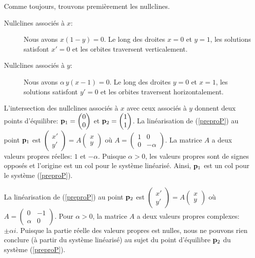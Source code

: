 {Comme toujours, trouvons premièrement les nullclines.
\begin{description}
\item[Nullclines associés à $x$:] Nous avons $x(1-y) = 0$.  Le long des droites
$x=0$ et $y=1$, les solutions satisfont
$x' = 0$ et les orbites traversent verticalement.
\item[Nullclines associés à $y$:] Nous avons $\alpha \,y(x - 1) = 0$.
Le long des droites $y=0$ et $x=1$, les solutions satisfont
$y' =0$ et les orbites traversent horizontalement.
\end{description}
L'intersection des nullclines associés à $x$ avec ceux associés à $y$
donnent deux points d'équilibre:
$\displaystyle \mathbf{p}_1 = \begin{pmatrix} 0 \\ 0 \end{pmatrix}$ et
$\displaystyle \mathbf{p}_2 = \begin{pmatrix} 1 \\ 1 \end{pmatrix}$.
La linéarisation de (\ref{preproP}) au point $\mathbf{p}_1$ est
$\begin{pmatrix} x' \\ y' \end{pmatrix} = A
\begin{pmatrix} x \\ y \end{pmatrix}$ où
$\displaystyle A = \begin{pmatrix} 1 & 0 \\ 0 & -\alpha \end{pmatrix}$.
La matrice $A$ a deux valeurs propres réelles: $1$ et $-\alpha$.  Puisque
$\alpha >0$, les valeurs propres sont de signes opposés et l'origine
est un col pour le système linéarisé.  Ainsi, $\mathbf{p}_1$ est un col
pour le système (\ref{preproP}).

La linéarisation de (\ref{preproP}) au point $\mathbf{p}_2$ est
$\begin{pmatrix} x' \\ y' \end{pmatrix} = A
\begin{pmatrix} x \\ y \end{pmatrix}$ où
$\displaystyle A = \begin{pmatrix} 0 & -1 \\ \alpha & 0 \end{pmatrix}$.
Pour $\alpha>0$, la matrice $A$ a deux valeurs propres complexes:
$\pm \alpha i$.  Puisque la partie réelle des valeurs propres est
nulles, nous ne pouvons rien conclure (à partir du système linéarisé) au
sujet du point d'équilibre $\mathbf{p}_2$ du système (\ref{preproP}).

}
